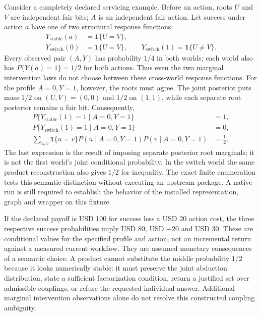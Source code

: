 Consider a completely declared servicing example. Before an action, roots
$U$ and $V$ are independent fair bits; $A$ is an independent fair action.
Let success under action $a$ have one of two structural response functions:
\begin{align}
 Y_{\mathrm{stable}}(a)&=\mathbf 1\{U=V\},\nonumber\\
 Y_{\mathrm{switch}}(0)&=\mathbf 1\{U=V\},\qquad
 Y_{\mathrm{switch}}(1)=\mathbf 1\{U\ne V\}.
 \label{exec19:cxxid-coupling}
\end{align}
Every observed pair $(A,Y)$ has probability $1/4$ in both worlds; each world
also has $P\{Y(a)=1\}=1/2$ for both actions. Thus even the two marginal
intervention laws do not choose between these cross-world response functions.
For the profile $A=0,Y=1$, however, the roots must agree. The joint posterior
puts mass $1/2$ on $(U,V)=(0,0)$ and $1/2$ on $(1,1)$, while each separate
root posterior remains a fair bit. Consequently,
\begin{align}
 P\{Y_{\mathrm{stable}}(1)=1\mid A=0,Y=1\}&=1,\nonumber\\
 P\{Y_{\mathrm{switch}}(1)=1\mid A=0,Y=1\}&=0,\nonumber\\
 \sum_{u,v}\mathbf 1\{u=v\}P(u\mid A=0,Y=1)P(v\mid A=0,Y=1)&=\tfrac12.
 \label{exec19:cxxid-joint}
\end{align}
The last expression is the result of imposing separate posterior root
marginals; it is not the first world's joint conditional probability. In the
switch world the same product reconstruction also gives $1/2$ for inequality.
The exact finite enumeration tests this semantic distinction without executing
an upstream package. A native run is still required to establish the behavior
of the installed representation, graph and wrapper on this fixture.
\citep{exec19_cxx_identification_reference}

If the declared payoff is USD 100 for success less a USD 20 action cost, the
three respective success probabilities imply USD 80, USD $-20$ and USD 30.
These are conditional values for the specified profile and action, not an
incremental return against a measured current workflow. They are assumed
monetary consequences of a semantic choice. A product cannot substitute the
middle probability $1/2$ because it looks numerically stable: it must preserve
the joint abduction distribution, state a sufficient factorization condition,
return a justified set over admissible couplings, or refuse the requested
individual answer. Additional marginal intervention observations alone do not
resolve this constructed coupling ambiguity.
\citep{exec19_cxx_identification_reference}

